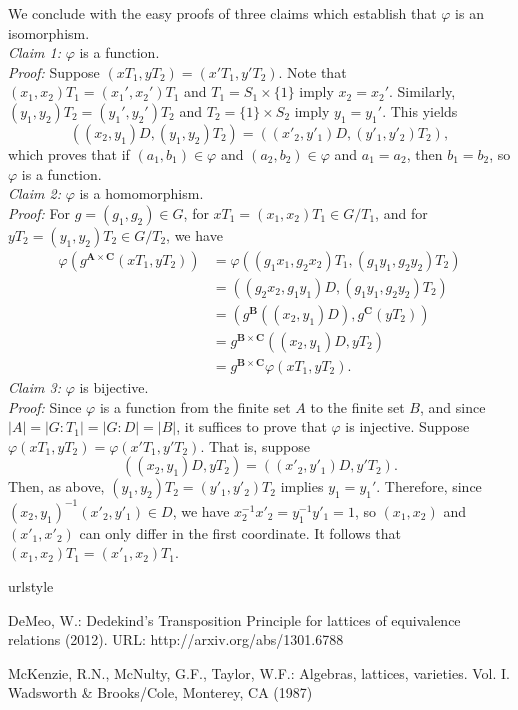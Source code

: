 \documentclass{au}
\theoremstyle{plain}
\theoremstyle{definition}
\newcounter{claim}
\theoremstyle{remark}
\newcommand{\<}{\ensuremath{\langle}}
\renewcommand{\>}{\ensuremath{\rangle}}
\renewcommand{\phi}{\ensuremath{\varphi}}
\newcommand{\bA}{\ensuremath{\mathbf{A}}}
\newcommand{\bB}{\ensuremath{\mathbf{B}}}
\newcommand{\bC}{\ensuremath{\mathbf{C}}}
\renewcommand{\phi}{\ensuremath{\varphi}}
\begin{document}
We conclude with the easy proofs of three claims which establish that $\phi$ is an isomorphism.
\\[4pt]
{\it Claim 1:} $\phi$ is a function.\\[2pt]
{\it Proof:} Suppose $(xT_1, yT_2) = (x'T_1, y'T_2)$.  Note that 
$(x_1,x_2)T_1 = (x_1',x_2')T_1$ and $T_1 = S_1\times \{1\}$ imply $x_2 =
x_2'$.  Similarly, 
$(y_1,y_2)T_2 = (y_1',y_2')T_2$ and $T_2 = \{1\}\times S_2$ imply $y_1 =
y_1'$. 
This yields
\[
((x_2,y_1)D, (y_1,y_2)T_2)
= ((x'_2,y'_1)D, (y'_1,y'_2)T_2),
\]
which proves that if $(a_1,b_1)\in \phi$ and
$(a_2,b_2) \in \phi$ and $a_1 = a_2$, then $b_1 = b_2$, so $\phi$ is a function.\\[4pt]
{\it Claim 2:} $\phi$ is a homomorphism.\\[2pt]
{\it Proof:} For
$g = (g_1, g_2) \in G$, for
$xT_1 = (x_1, x_2)T_1 \in G/T_1$, and for
$yT_2 = (y_1, y_2)T_2 \in G/T_2$, we have
\begin{align*}
\phi(g^{\bA\times \bC}(xT_1, yT_2)) 
&= \phi((g_1x_1,g_2x_2)T_1, (g_1y_1,g_2y_2)T_2) \\
&= ((g_2x_2,g_1y_1)D, (g_1y_1,g_2y_2)T_2) \\
&= (g^{\bB}((x_2,y_1)D), g^{\bC}(yT_2)) \\
&= g^{\bB\times \bC}((x_2,y_1)D, yT_2) \\
&= g^{\bB\times \bC}\phi(xT_1, yT_2).
\end{align*}
{\it Claim 3:} $\phi$ is bijective.\\[2pt]
{\it Proof:} 
Since $\phi$ is a function from the finite set $A$ to the finite set $B$, and
since $|A|= |G:T_1| = |G:D| = |B|$, it suffices to prove that $\phi$ is
injective.  Suppose $\phi(xT_1, yT_2) = \phi(x'T_1, y'T_2)$.
That is,  suppose
\[
((x_2,y_1)D, yT_2) = 
((x'_2,y'_1)D, y'T_2).
\]
Then, as above,
$(y_1,y_2)T_2 = (y'_1,y'_2)T_2$ implies $y_1 = y_1'$.  Therefore,
 since $(x_2,y_1)^{-1}(x'_2,y'_1) \in D$, we have
$x_2^{-1}x'_2 = y_1^{-1}y'_1 = 1$,  
so %
$(x_1,x_2)$ and $(x'_1,x'_2)$ can 
only differ in the first coordinate.  It follows that
$(x_1,x_2)T_1 = (x'_1,x_2)T_1$.
\def\cprime{$'$} \def\cprime{$'$}
  \def\ocirc#1{\ifmmode\setbox0=\hbox{$#1$}\dimen0=\ht0 \advance\dimen0
  by1pt\rlap{\hbox to\wd0{\hss\raise\dimen0
  \hbox{\hskip.2em$\scriptscriptstyle\circ$}\hss}}#1\else {\accent"17 #1}\fi}
\begin{thebibliography}{1}
\providecommand{\url}[1]{{#1}}
\providecommand{\urlprefix}{URL: }
\expandafter\ifx\csname urlstyle\endcsname\relax
  \providecommand{\doi}[1]{DOI~\discretionary{}{}{}#1}\else
  \providecommand{\doi}{DOI~\discretionary{}{}{}\begingroup
  \urlstyle{rm}\Url}\fi

DeMeo, W.: {D}edekind's {T}ransposition {P}rinciple for lattices of equivalence
  relations (2012).
\newblock \urlprefix\url{http://arxiv.org/abs/1301.6788}

McKenzie, R.N., McNulty, G.F., Taylor, W.F.: Algebras, lattices, varieties.
  {V}ol. {I}.
\newblock Wadsworth \& Brooks/Cole, Monterey, CA (1987)

\end{thebibliography}
\end{document}

